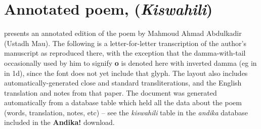 \chapter{Annotated poem,  (\textit{Kiswahili})}
\renewcommand{\thesection}{D/\arabic{section}}  %
\setcounter{section}{0}  %

\citet{Abdulkadir2013} presents an annotated edition of the poem  by Mahmoud Ahmad Abdulkadir (Ustadh Mau).  The following is a letter-for-letter transcription of the author's manuscript as reproduced there, with the exception that the damma-with-tail occasionally used by him to signify \textbf{o} is denoted here with inverted damma (eg in  in 1d), since the font does not yet include that glyph.  The layout also includes automatically-generated close and standard transliterations, and the English translation and notes from that paper.  The document was generated automatically from a database table which held all the data about the poem (words, translation, notes, etc) -- see the \textit{kiswahili} table in the \textit{andika} database included in the \textbf{Andika!} download.

